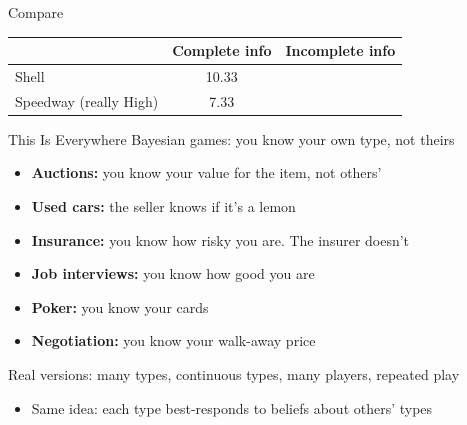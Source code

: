 \begin{frame}{Compare}
\centering
\renewcommand{\arraystretch}{1.6}
\begin{tabular}{|l|c|c|}
\hline
 & Complete info & Incomplete info \\
\hline
Shell & 10.33 & \hspace{0.8in} \\
Speedway (really High) & 7.33 & \\
\hline
\end{tabular}
\bsk
\raggedright
{}
\bsk
{}
\vspace{-0.3in}
\end{frame}

\begin{frame}{This Is Everywhere}
Bayesian games: you know your own type, not theirs
\begin{itemize}
    \item \textbf{Auctions:} you know your value for the item, not others'
    \item \textbf{Used cars:} the seller knows if it's a lemon
    \item \textbf{Insurance:} you know how risky you are. The insurer doesn't
    \item \textbf{Job interviews:} you know how good you are
    \item \textbf{Poker:} you know your cards
    \item \textbf{Negotiation:} you know your walk-away price
\end{itemize}
\bsk
Real versions: many types, continuous types, many players, repeated play
\begin{itemize}
    \item Same idea: each type best-responds to beliefs about others' types
\end{itemize}
\vspace{-0.3in}
\end{frame}

